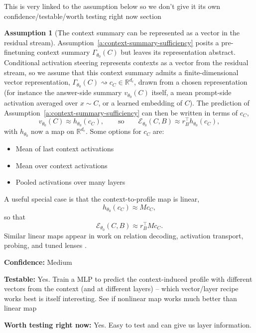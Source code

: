 \documentclass[11pt]{article}
\theoremstyle{definition}
\theoremstyle{definition}
\theoremstyle{assumptionstyle}
\newtheorem{assumption}{Assumption}[section]
\newcounter{prediction}
\newcommand{\Expr}{\mathcal{E}}        %
\newcommand{\R}{\mathbb{R}}
\begin{document}
This is very linked to the assumption below so we don't give it its own confidence/testable/worth testing right now section
\begin{assumption}[The context summary can be represented as a vector in the residual stream]
\label{a:context-vectorization}
Assumption~\ref{a:context-summary-sufficiency} posits a pre-finetuning context summary \(\Gamma_{\theta_0}(C)\) but leaves its representation abstract. Conditional activation steering \cite{lee2025} represents contexts as a vector from the residual stream, so we assume that this context summary admits a finite-dimensional vector representation,
\(\Gamma_{\theta_0}(C)\rightsquigarrow c_{C}\in\R^{d_c}\), drawn from a chosen
representation (for instance the answer-side summary \(v_{\theta_0}(C)\) itself, a
mean prompt-side activation averaged over \(x\sim C\), or a learned
embedding of \(C\)). The
prediction of Assumption~\ref{a:context-summary-sufficiency} can then be written
in terms of \(c_{C}\),
\[
v_{\theta_0}(C)
\approx
h_{\theta_0}(c_{C}),
\qquad\text{so}\qquad
\Expr_{\theta_0}(C,B)
\approx
r_B^\top h_{\theta_0}(c_{C}),
\]
with \(h_{\theta_0}\) now a map on \(\R^{d_c}\).
Some options for $c_C$ are:
\begin{itemize}
    \item Mean of last context activations
    \item Mean over context activations
    \item Pooled activations over many layers
\end{itemize}

A useful special case is that the context-to-profile map is linear,
\[
h_{\theta_0}(c_{C})\approx M c_{C},
\]
so that
\[
\Expr_{\theta_0}(C,B)
\approx
r_B^\top M c_{C}.
\]
 Similar linear maps appear in work on relation decoding, activation
transport, probing, and tuned lenses
\cite{hernandez2024,szablewski2025,belrose2023,gurnee2023}.

\textbf{Confidence:} Medium

\textbf{Testable:} Yes. Train a MLP to predict the context-induced profile with different vectors from the context (and at different layers) -- which vector/layer recipe works best is itself interesting. See if nonlinear map works much better than linear map

\textbf{Worth testing right now:} Yes. Easy to test and can give us layer information. 
\end{assumption}
\end{document}
